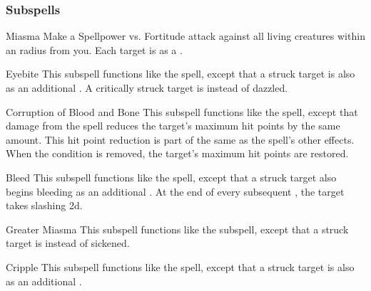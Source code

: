 \subsubsection{Subspells}


\begin{ability}[\nth{1}]{Miasma}
Make a Spellpower vs. Fortitude attack against all living creatures within an \areamed radius from you.
\hit Each target is  as a .
\end{ability}
\vspace{0.25em}


\begin{ability}[\nth{2}]{Eyebite}
This subspell functions like the  spell, except that a struck target is also  as an additional .
A critically struck target is  instead of dazzled.
\end{ability}
\vspace{0.25em}


\begin{ability}[\nth{3}]{Corruption of Blood and Bone}
This subspell functions like the  spell, except that damage from the spell reduces the target's maximum hit points by the same amount.
This hit point reduction is part of the same  as the spell's other effects.
When the condition is removed, the target's maximum hit points are restored.
\end{ability}
\vspace{0.25em}


\begin{ability}[\nth{4}]{Bleed}
This subspell functions like the  spell, except that a struck target also begins bleeding as an additional .
At the end of every subsequent , the target takes slashing  \minus2d.
\end{ability}
\vspace{0.25em}


\begin{ability}[\nth{4}]{Greater Miasma}
This subspell functions like the  subspell, except that a struck target is  instead of sickened.
\end{ability}
\vspace{0.25em}


\begin{ability}[\nth{5}]{Cripple}
This subspell functions like the  spell, except that a struck target is also  as an additional .
\end{ability}
\vspace{0.25em}


